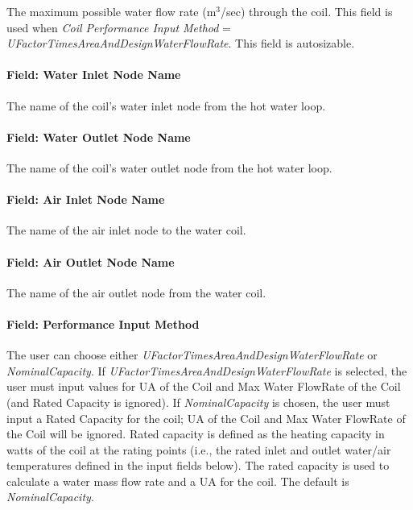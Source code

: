 The maximum possible water flow rate (m\(^{3}\)/sec) through the coil. This field is used when \emph{Coil Performance Input Method} = \emph{UFactorTimesAreaAndDesignWaterFlowRate}. This field is autosizable.

\paragraph{Field: Water Inlet Node Name}\label{field-water-inlet-node-name-1-000}

The name of the coil's water inlet node from the hot water loop.

\paragraph{Field: Water Outlet Node Name}\label{field-water-outlet-node-name-1-000}

The name of the coil's water outlet node from the hot water loop.

\paragraph{Field: Air Inlet Node Name}\label{field-air-inlet-node-name-1-003}

The name of the air inlet node to the water coil.

\paragraph{Field: Air Outlet Node Name}\label{field-air-outlet-node-name-1-002}

The name of the air outlet node from the water coil.

\paragraph{Field: Performance Input Method}\label{field-performance-input-method-001}

The user can choose either \emph{UFactorTimesAreaAndDesignWaterFlowRate} or \emph{NominalCapacity}. If \emph{UFactorTimesAreaAndDesignWaterFlowRate} is selected, the user must input values for UA of the Coil and Max Water FlowRate of the Coil (and Rated Capacity is ignored). If \emph{NominalCapacity} is chosen, the user must input a Rated Capacity for the coil; UA of the Coil and Max Water FlowRate of the Coil will be ignored. Rated capacity is defined as the heating capacity in watts of the coil at the rating points (i.e., the rated inlet and outlet water/air temperatures defined in the input fields below). The rated capacity is used to calculate a water mass flow rate and a UA for the coil. The default is \emph{NominalCapacity}.

